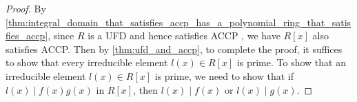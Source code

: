 \begin{proof}
  By \cref{thm:integral_domain_that_satisfies_accp_has_a_polynomial_ring_that_satisfies_accp}, since $R$ is a UFD and hence satisfies ACCP , we have $R[x]$ also satisfies ACCP. Then by \cref{thm:ufd_and_accp}, to complete the proof, it suffices to show that every irreducible element $l(x) \in R[x]$ is prime. To show that an irreducible element $l(x) \in R[x]$ is prime, we need to show that if $l(x) \mid f(x) g(x)$ in $R[x]$, then $l(x) \mid f(x)$ or $l(x) \mid g(x)$.
\end{proof}



